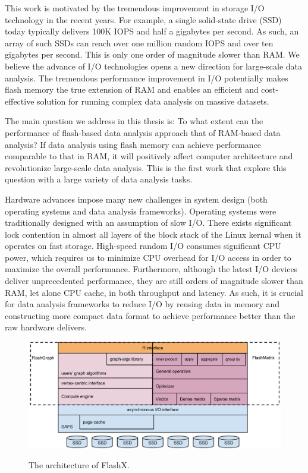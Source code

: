 This work is motivated by the tremendous improvement in storage I/O technology
in the recent years. For example, a single solid-state drive (SSD) today
typically delivers 100K IOPS and half a gigabytes per second. As such,
an array of such SSDs can reach over one million random IOPS and over ten
gigabytes per second. This is only one order of magnitude slower than RAM.
We believe the advance of I/O technologies opens a new direction for
large-scale data analysis. The tremendous performance
improvement in I/O potentially makes flash memory the true extension of RAM
and enables an efficient and cost-effective solution for running complex
data analysis on massive datasets.

The main question we address in this thesis is:
To what extent can the performance of flash-based
data analysis approach that of RAM-based data analysis? If data
analysis using flash memory can achieve performance comparable to that in RAM,
it will positively affect computer architecture and revolutionize large-scale
data analysis. This is the first work that explore this question with
a large variety of data analysis tasks.

Hardware advances impose many new challenges in system design (both operating
systems and data analysis frameworks). Operating systems were traditionally
designed with an assumption of slow I/O. There exists significant lock contention
in almost all layers of the block stack of the Linux kernal when it operates on
fast storage. High-speed random I/O consumes significant CPU power, which
requires us to minimize CPU overhead for I/O access in order to maximize
the overall performance. Furthermore, although the latest I/O devices deliver
unprecedented performance, they are still orders of magnitude slower than RAM,
let alone CPU cache, in both
throughput and latency. As such, it is crucial for data analysis frameworks to
reduce I/O by reusing data in memory and constructing more compact data format
to achieve performance better than the raw hardware delivers.

\makeatletter
\let\@currsize\normalsize
\makeatother

\begin{figure}[t]
\centering
\includegraphics[scale=0.5]{figs/arch.pdf}
\label{fig:arch}
\caption{The architecture of FlashX.}
\end{figure}

